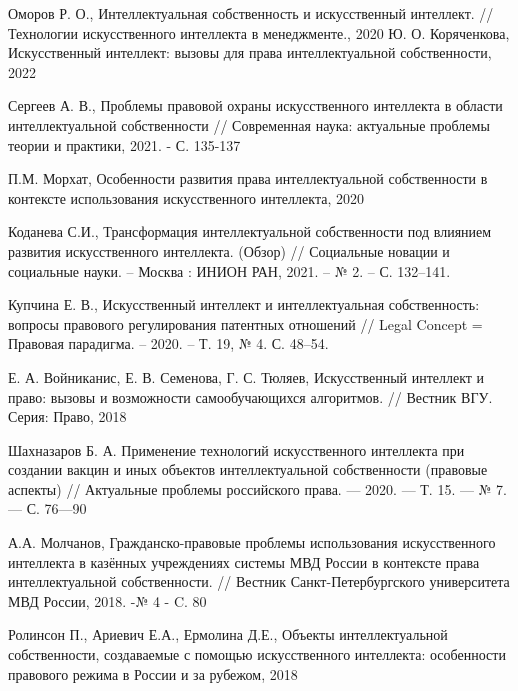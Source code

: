 \begin{thebibliography}{}
Оморов Р. О., Интеллектуальная собственность и искусственный интеллект. // Технологии искусственного
интеллекта в менеджменте., 2020
Ю. О. Коряченкова, Искусственный интеллект: вызовы для права интеллектуальной
собственности, 2022

Сергеев А. В., Проблемы правовой охраны искусственного интеллекта в области
интеллектуальной собственности // Современная наука: актуальные проблемы
теории и практики, 2021. - С. 135-137

П.М. Морхат, Особенности развития права интеллектуальной собственности в
контексте использования искусственного интеллекта, 2020

Коданева С.И., Трансформация интеллектуальной собственности под влиянием развития искусственного интеллекта.
(Обзор) // Социальные новации и социальные науки. – Москва : ИНИОН РАН, 2021. – № 2. – С. 132–141.

Купчина Е. В., Искусственный интеллект и интеллектуальная собственность: вопросы правового регулирования патентных отношений
// Legal Concept = Правовая парадигма. – 2020. – Т. 19, № 4. С. 48–54.

Е. А. Войниканис, Е. В. Семенова, Г. С. Тюляев, Искусственный интеллект и право: вызовы и возможности
самообучающихся алгоритмов. // Вестник ВГУ. Серия: Право, 2018

Шахназаров Б. А. Применение технологий искусственного интеллекта при создании вакцин и иных объектов интеллектуальной
собственности (правовые аспекты) // Актуальные проблемы российского права. — 2020. — Т. 15. — № 7. — С. 76—90

А.А. Молчанов, Гражданско-правовые проблемы использования искусственного интеллекта в казённых учреждениях
системы МВД России в контексте права интеллектуальной собственности. // Вестник Санкт-Петербургского университета
МВД России, 2018. -№ 4 - C. 80

Ролинсон П., Ариевич Е.А., Ермолина Д.Е., Объекты интеллектуальной собственности, создаваемые с помощью
искусственного интеллекта: особенности правового режима в России и за рубежом, 2018

\end{thebibliography}



